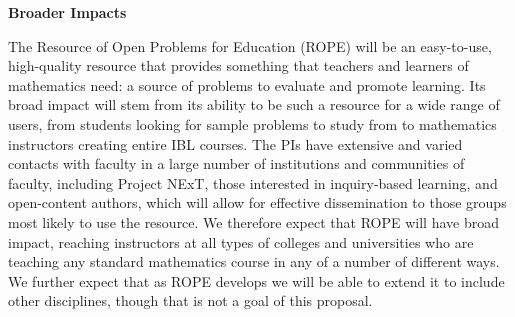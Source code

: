 \documentclass[11pt]{article}
\begin{document}
\bigskip\bigskip
\noindent
{\large \textbf{Broader Impacts}}

The Resource of Open Problems for Education (ROPE) will be an easy-to-use,
high-quality resource that provides something that teachers and learners
of mathematics need: a source of problems to evaluate and promote
learning.  Its broad impact will stem from its ability to be such a
resource for a wide range of users, from students looking for sample
problems to study from to mathematics instructors creating entire IBL
courses.  The PIs have extensive and varied contacts with faculty in a
large number of institutions and communities of faculty, including Project
NExT, those interested in inquiry-based learning, and open-content
authors, which will allow for effective dissemination to those groups most
likely to use the resource.  We therefore expect that ROPE will have broad
impact, reaching instructors at all types of colleges and universities who
are teaching any standard mathematics course in any of a number of
different ways.  We further expect that as ROPE develops we will be able
to extend it to include other disciplines, though that is not a goal of
this proposal.
\end{document}
